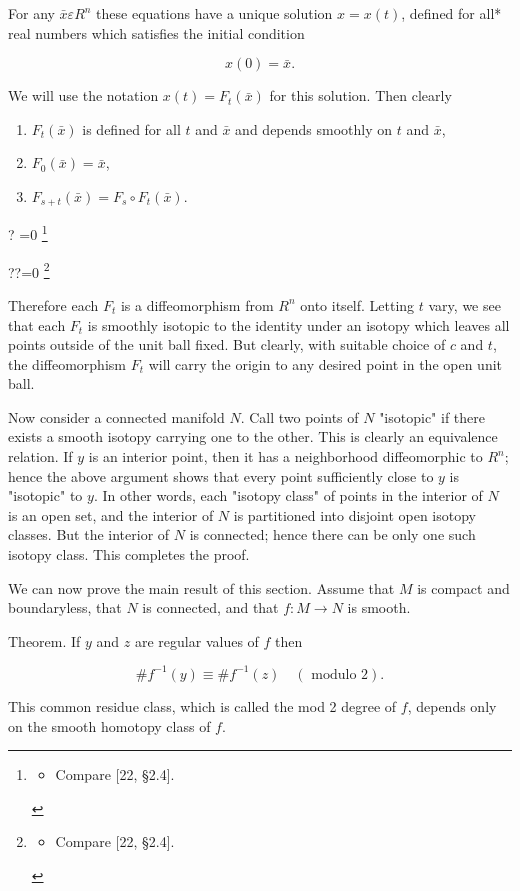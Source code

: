 \documentclass[10pt, letterpaper]{article}
\let\svthefootnote\thefootnote
\newcommand\blfootnotetext[1]{%
  \let\thefootnote\relax\footnote{#1}%
  \addtocounter{footnote}{-1}%
  \let\thefootnote\svthefootnote%
}
\let\svfootnotetext\footnotetext
\renewcommand\footnotetext[2][?]{%
  \if\relax#1\relax%
    \ifnum\value{footnote}=0\blfootnotetext{#2}\else\svfootnotetext{#2}\fi%
  \else%
    \if?#1\ifnum\value{footnote}=0\blfootnotetext{#2}\else\svfootnotetext{#2}\fi%
    \else\svfootnotetext[#1]{#2}\fi%
  \fi
}
\begin{document}
For any $\bar{x} \varepsilon R^{n}$ these equations have a unique solution $x=x(t)$, defined for all* real numbers which satisfies the initial condition

$$
x(0)=\bar{x} .
$$

We will use the notation $x(t)=F_{t}(\bar{x})$ for this solution. Then clearly

\begin{enumerate}
  \item $F_{t}(\bar{x})$ is defined for all $t$ and $\bar{x}$ and depends smoothly on $t$ and $\bar{x}$,
  \item $F_{0}(\bar{x})=\bar{x}$,
  \item $F_{s+t}(\bar{x})=F_{s} \circ F_{t}(\bar{x})$.
\end{enumerate}

\footnotetext{\begin{itemize}
  \item Compare [22, §2.4].
\end{itemize}
}Therefore each $F_{t}$ is a diffeomorphism from $R^{n}$ onto itself. Letting $t$ vary, we see that each $F_{t}$ is smoothly isotopic to the identity under an isotopy which leaves all points outside of the unit ball fixed. But clearly, with suitable choice of $c$ and $t$, the diffeomorphism $F_{t}$ will carry the origin to any desired point in the open unit ball.

Now consider a connected manifold $N$. Call two points of $N$ "isotopic" if there exists a smooth isotopy carrying one to the other. This is clearly an equivalence relation. If $y$ is an interior point, then it has a neighborhood diffeomorphic to $R^{n}$; hence the above argument shows that every point sufficiently close to $y$ is "isotopic" to $y$. In other words, each "isotopy class" of points in the interior of $N$ is an open set, and the interior of $N$ is partitioned into disjoint open isotopy classes. But the interior of $N$ is connected; hence there can be only one such isotopy class. This completes the proof.

We can now prove the main result of this section. Assume that $M$ is compact and boundaryless, that $N$ is connected, and that $f: M \rightarrow N$ is smooth.

Theorem. If $y$ and $z$ are regular values of $f$ then

$$
\# f^{-1}(y) \equiv \# f^{-1}(z) \quad(\text { modulo } 2) .
$$

This common residue class, which is called the mod 2 degree of $f$, depends only on the smooth homotopy class of $f$.
\end{document}
